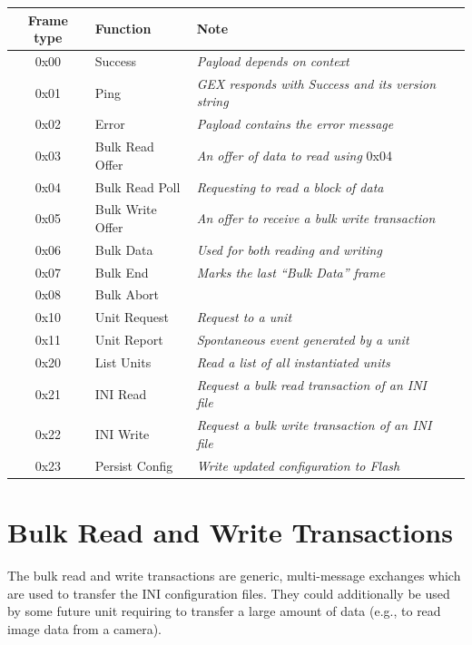 \begin{table}[h]
	\centering
	\begin{tabular}{clll}
		\toprule
		\textbf{Frame type} & \textbf{Function} & \textbf{Note} \\
		\midrule
		0x00 & Success & \textit{Payload depends on context} \\
		0x01 & Ping & \textit{GEX responds with Success and its version string} \\
		0x02 & Error & \textit{Payload contains the error message} \\
		\midrule
		0x03 & Bulk Read Offer & \textit{An offer of data to read using }0x04 \\
		0x04 & Bulk Read Poll & \textit{Requesting to read a block of data} \\
		0x05 & Bulk Write Offer & \textit{An offer to receive a bulk write transaction} \\
		0x06 & Bulk Data & \textit{Used for both reading and writing} \\
		0x07 & Bulk End & \textit{Marks the last ``Bulk Data'' frame} \\
		0x08 & Bulk Abort & \textit{} \\
		\midrule
		0x10 & Unit Request & \textit{Request to a unit} \\
		0x11 & Unit Report & \textit{Spontaneous event generated by a unit} \\
		\midrule
		0x20 & List Units & \textit{Read a list of all instantiated units} \\
		0x21 & INI Read & \textit{Request a bulk read transaction of an INI file} \\
		0x22 & INI Write & \textit{Request a bulk write transaction of an INI file} \\
		0x23 & Persist Config & \textit{Write updated configuration to Flash} \\
		\bottomrule
	\end{tabular}
\end{table}


\section{Bulk Read and Write Transactions} \label{sec:tf-bulk-rw}

The bulk read and write transactions are generic, multi-message exchanges which are used to transfer the INI configuration files. They could additionally be used by some future unit requiring to transfer a large amount of data (e.g., to read image data from a camera).

